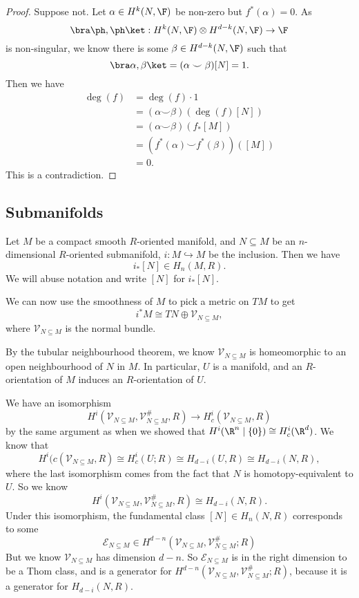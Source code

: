 \documentclass[a4paper]{article}
\begin{document}
\begin{proof}
  Suppose not. Let $\alpha \in H^k(N, \F)$ be non-zero but $f^*(\alpha) = 0$. As
  \[
    \bra \ph, \ph \ket: H^k(N, \F) \otimes H^{d - k}(N, \F) \to \F
  \]
  is non-singular, we know there is some $\beta \in H^{d - k}(N, \F)$ such that
  \[
    \bra \alpha, \beta\ket = (\alpha \smile \beta)[N] = 1.
  \]
  Then we have
  \begin{align*}
    \deg(f) &= \deg (f) \cdot 1 \\
    &= (\alpha \smile \beta)(\deg(f) [N]) \\
    &= (\alpha \smile \beta) (f_*[M]) \\
    &= (f^*(\alpha) \smile f^*(\beta))([M])\\
    &= 0.
  \end{align*}
  This is a contradiction.
\end{proof}

\subsection{Submanifolds}
Let $M$ be a compact smooth $R$-oriented manifold, and $N \subseteq M$ be an $n$-dimensional $R$-oriented submanifold, $i: M \hookrightarrow M$ be the inclusion. Then we have
\[
  i_*[N] \in H_n(M, R).
\]
We will abuse notation and write $[N]$ for $i_* [N]$.

We can now use the smoothness of $M$ to pick a metric on $TM$ to get
\[
  i^*M \cong TN \oplus \mathcal{V}_{N \subseteq M},
\]
where $\mathcal{V}_{N\subseteq M}$ is the normal bundle.

By the tubular neighbourhood theorem, we know $\mathcal{V}_{N \subseteq M}$ is homeomorphic to an open neighbourhood of $N$ in $M$. In particular, $U$ is a manifold, and an $R$-orientation of $M$ induces an $R$-orientation of $U$.

We have an isomorphism
\[
  H^i(\mathcal{V}_{N \subseteq M}, \mathcal{V}_{N \subseteq M}^\#, R) \to H_c^i(\mathcal{V}_{N \subseteq M}, R)
\]
by the same argument as when we showed that $H^i( \R^n \mid \{0\}) \cong H_c^i(\R^d)$.
We know that
\[
  H^i(c(\mathcal{V}_{N \subseteq M}, R) \cong H_c^i(U; R) \cong H_{d - i}(U, R) \cong H_{d - i}(N, R),
\]
where the last isomorphism comes from the fact that $N$ is homotopy-equivalent to $U$. So we know
\[
  H^i(\mathcal{V}_{N \subseteq M}, \mathcal{V}_{N \subseteq M}^\#, R) \cong H_{d - i}(N, R).
\]
Under this isomorphism, the fundamental class $[N] \in H_n(N, R)$ corresponds to some
\[
  \mathcal{E}_{N \subseteq M} \in H^{d - n}(\mathcal{V}_{N \subseteq M}, \mathcal{V}_{N \subseteq M}^\#; R)
\]
But we know $\mathcal{V}_{N \subseteq M}$ has dimension $d - n$. So $\mathcal{E}_{N \subseteq M}$ is in the right dimension to be a Thom class, and is a generator for $H^{d - n}(\mathcal{V}_{N \subseteq M}, \mathcal{V}_{N \subseteq M}^\#; R)$, because it is a generator for $H_{d - i}(N, R)$.
\end{document}
